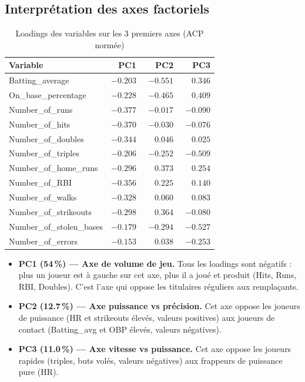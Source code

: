 \documentclass[11pt,a4paper]{article}
\begin{document}
\subsection{Interprétation des axes factoriels}

\begin{table}[H]
\centering
\caption{Loadings des variables sur les 3 premiers axes (ACP normée)}
\label{tab:loadings}
\small
\begin{tabular}{lrrr}
\toprule
\textbf{Variable} & \textbf{PC1} & \textbf{PC2} & \textbf{PC3} \\
\midrule
Batting\_average      & $-0.203$ & $-0.551$ & $\phantom{-}0.346$ \\
On\_base\_percentage  & $-0.228$ & $-0.465$ & $\phantom{-}0.409$ \\
Number\_of\_runs      & $-0.377$ & $-0.017$ & $-0.090$ \\
Number\_of\_hits      & $-0.370$ & $-0.030$ & $-0.076$ \\
Number\_of\_doubles   & $-0.344$ & $\phantom{-}0.046$ & $\phantom{-}0.025$ \\
Number\_of\_triples   & $-0.206$ & $-0.252$ & $-0.509$ \\
Number\_of\_home\_runs& $-0.296$ & $\phantom{-}0.373$ & $\phantom{-}0.254$ \\
Number\_of\_RBI       & $-0.356$ & $\phantom{-}0.225$ & $\phantom{-}0.140$ \\
Number\_of\_walks     & $-0.328$ & $\phantom{-}0.060$ & $\phantom{-}0.083$ \\
Number\_of\_strikeouts& $-0.298$ & $\phantom{-}0.364$ & $-0.080$ \\
Number\_of\_stolen\_bases & $-0.179$ & $-0.294$ & $-0.527$ \\
Number\_of\_errors    & $-0.153$ & $\phantom{-}0.038$ & $-0.253$ \\
\bottomrule
\end{tabular}
\end{table}

\begin{itemize}
  \item \textbf{PC1 (54\,\%) --- Axe de volume de jeu.} Tous les loadings sont
        négatifs : plus un joueur est à gauche sur cet axe, plus il a joué et
        produit (Hits, Runs, RBI, Doubles). C'est l'axe qui oppose les titulaires
        réguliers aux remplaçants.\vspace{0.3cm}
  \item \textbf{PC2 (12.7\,\%) --- Axe puissance vs précision.} Cet axe oppose
        les joueurs de puissance (HR et strikeouts élevés, valeurs positives) aux
        joueurs de contact (Batting\_avg et OBP élevés, valeurs négatives).\vspace{0.3cm}
  \item \textbf{PC3 (11.0\,\%) --- Axe vitesse vs puissance.} Cet axe oppose
        les joueurs rapides (triples, buts volés, valeurs négatives) aux frappeurs de
        puissance pure (HR).
\end{itemize}
\end{document}
